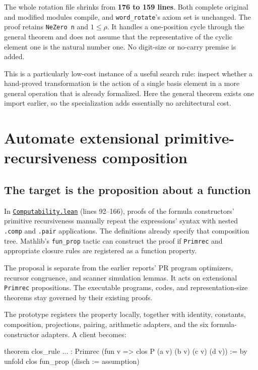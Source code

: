 \documentclass[11pt,letterpaper]{article}
\newcommand{\code}[1]{\nolinkurl{#1}}
\newcommand{\src}[2]{\href{https://github.com/VladimirReshetnikov/ProveIt/blob/e73fa2e916c9bb6f61c79e4fe2cd02b5f43e9d11/Computability/DiophantineConsistency/Lean/DiophantineConsistency/#1.lean}{\nolinkurl{#1.lean}} (lines #2)}
\begin{document}
The whole rotation file shrinks from \textbf{176 to 159 lines}. Both complete original and modified modules compile, and \code{word_rotate}'s axiom set is unchanged. The proof retains \code{NeZero n} and \(1\le\rho\). It handles a one-position cycle through the general theorem and does not assume that the representative of the cyclic element one is the natural number one. No digit-size or no-carry premise is added.

This is a particularly low-cost instance of a useful search rule: inspect whether a hand-proved transformation is the action of a single basis element in a more general operation that is already formalized. Here the general theorem exists one import earlier, so the specialization adds essentially no architectural cost.

\section{Automate extensional primitive-recursiveness composition}

\subsection{The target is the proposition about a function}

In \src{Computability}{92--166}, proofs of the formula constructors' primitive recursiveness manually repeat the expressions' syntax with nested \code{.comp} and \code{.pair} applications. The definitions already specify that composition tree. Mathlib's \code{fun_prop} tactic can construct the proof if \code{Primrec} and appropriate closure rules are registered as a function property.

The proposal is separate from the earlier reports' PR program optimizers, recursor congruence, and scanner simulation lemmas. It acts on extensional \code{Primrec} propositions. The executable programs, codes, and representation-size theorems stay governed by their existing proofs.

The prototype registers the property locally, together with identity, constants, composition, projections, pairing, arithmetic adapters, and the six formula-constructor adapters. A client becomes:

\begin{Lean}
theorem clos_rule ... :
    Primrec (fun v => clos P (a v) (b v) (c v) (d v)) := by
  unfold clos
  fun_prop (disch := assumption)
\end{Lean}
\end{document}
